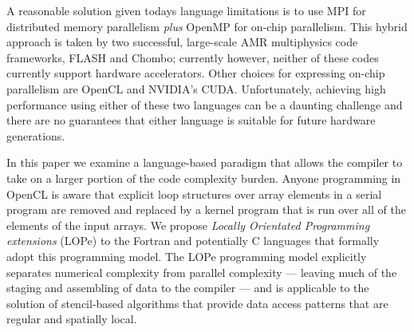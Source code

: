 A reasonable solution given todays language limitations is to use MPI for distributed memory
parallelism \emph{plus} OpenMP for on-chip parallelism.  This hybrid approach is taken by two
successful, large-scale AMR multiphysics code frameworks, FLASH and Chombo; currently however,
neither of these codes currently support hardware accelerators\cite{DBLP:journals/corr/DubeyS13}.
Other choices for expressing on-chip parallelism are OpenCL\cite{OPENCL} and NVIDIA's CUDA.
Unfortunately, achieving high performance using either of these two languages can be a daunting
challenge and there are no guarantees that either language is suitable for future hardware
generations.

In this paper we examine a language-based paradigm that allows the
compiler to take on a larger portion of the code complexity burden.
Anyone programming in OpenCL is aware that explicit loop
structures over array elements in a serial program are removed and
replaced by a kernel program that is run over all of the elements of
the input arrays.  We propose \emph{Locally Orientated Programming
extensions} (LOPe) to the Fortran and potentially C languages that
formally adopt this programming model.  The LOPe programming model
explicitly separates numerical complexity from parallel complexity ---
leaving much of the staging and assembling of data to the compiler ---
and is applicable to the solution of stencil-based algorithms that
provide data access patterns that are regular and spatially local.

